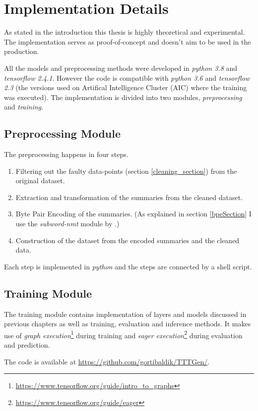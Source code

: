 \section{Implementation Details}

As stated in the introduction this thesis is highly theoretical and experimental. The implementation serves as proof-of-concept and doesn't aim to be used in the production.

All the models and preprocessing methods were developed in \emph{python 3.8} and \emph{tensorflow 2.4.1}. However the code is compatible with \emph{python 3.6} and \emph{tensorflow 2.3} (the versions used on Artifical Intelligence Cluster (AIC) where the training was executed). The implementation is divided into two modules, \emph{preprocessing} and \emph{training}.

\subsection{Preprocessing Module}

The preprocessing happens in four steps.
\begin{enumerate}
    \item Filtering out the faulty data-points (section \ref{cleaning_section}) from the original dataset.
    \item Extraction and transformation of the summaries from the cleaned dataset.
    \item Byte Pair Encoding of the summaries. (As explained in section \ref{bpeSection} I use the \emph{subword-nmt} module by \citep{sennrich2016}.)
    \item Construction of the dataset from the encoded summaries and the cleaned data. 
\end{enumerate}
Each step is implemented in \emph{python} and the steps are connected by a shell script.

\subsection{Training Module}

The training module contains implementation of layers and models discussed in previous chapters as well as training, evaluation and inference methods. It makes use of \emph{graph execution}\footnote{\url{https://www.tensorflow.org/guide/intro_to_graphs}} during training and \emph{eager execution}\footnote{\url{https://www.tensorflow.org/guide/eager}} during evaluation and prediction.

The code is available at \url{https://github.com/gortibaldik/TTTGen/}.